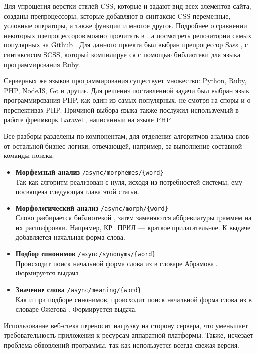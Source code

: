 \documentclass[a4paper,12pt]{article}
\begin{document}
Для упрощения верстки стилей CSS, которые и задают вид всех элементов сайта, созданы препроцессоры, которые добавляют в синтаксис CSS переменные, условные операторы, а также функции и многое другое. Подробнее о сравнении некоторых препроцессоров можно прочитать в \cite{css_comparison}, а посмотреть репозитории самых популярных на Github \cite{github_css}. Для данного проекта был выбран препроцессор Sass \cite{sass}, с синтаксисом SCSS, который компилируется с помощью библиотеки для языка программирования Ruby.

Серверных же языков программирования существует множество: Python, Ruby, PHP, NodeJS, Go и другие. Для решения поставленной задачи был выбран язык программирования PHP, как один из самых популярных, не смотря на споры \cite{quora_1} и \cite{quora_2} о перспективах PHP. Причиной выбора языка также послужил используемый в работе фреймворк Laravel \cite{laravel}, написанный на языке PHP.

Все разборы разделены по компонентам, для отделения алгоритмов анализа слов от остальной бизнес-логики, отвечающей, например, за выполнение составной команды поиска.

\begin{itemize}
\item \textbf{Морфемный анализ}  \texttt{/async/morphemes/\{word\}} \\ Так как алгоритм реализован с нуля, исходя из потребностей системы, ему посвящена следующая глава этой статьи.
\item \textbf{Морфологический анализ}  \texttt{/async/morph/\{word\}} \\ Слово разбирается библиотекой \cite{phpmorphy}, затем заменяются аббревиатуры граммем на их расшифровки. Например, КР\_ПРИЛ — краткое прилагательное. К выдаче добавляется начальная форма слова.
\item \textbf{Подбор синонимов}  \texttt{/async/synonyms/\{word\}} \\ Происходит поиск начальной форма слова из \cite{phpmorphy} в словаре Абрамова \cite{dicts}. Формируется выдача.
\item \textbf{Значение слова}  \texttt{/async/meaning/\{word\}} \\ Как и при подборе синонимов, происходит поиск начальной форма слова из \cite{phpmorphy} в словаре Ожегова \cite{dicts}. Формируется выдача.
\end{itemize}

Использование веб-стека переносит нагрузку на сторону сервера, что уменьшает требовательность приложения к ресурсам аппаратной платформы. Также, исчезает проблема обновлений программы, так как используется всегда свежая версия.
\end{document}
